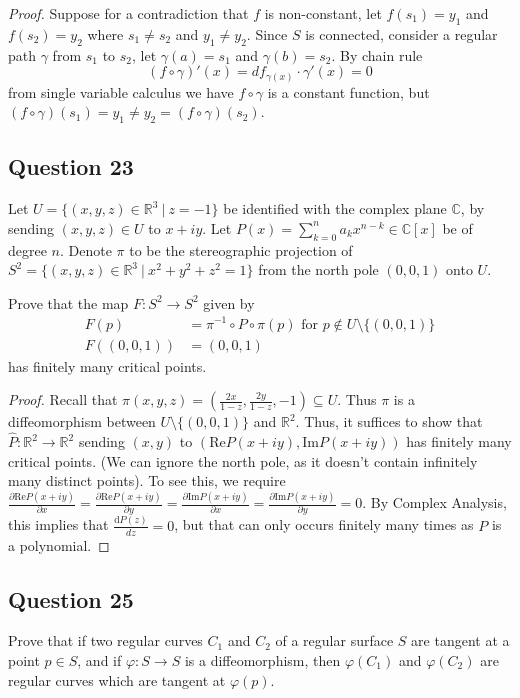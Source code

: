 \documentclass[12pt]{article}
\begin{document}
\emph{Proof.}
Suppose for a contradiction that \(f\) is non-constant, let \(f(s_1) = y_1\) and \(f(s_2) = y_2\) where \(s_1 \ne s_2\) and \(y_1 \ne y_2\).
Since \(S\) is connected, consider a regular path \(\gamma\) from \(s_1\) to \(s_2\), let \(\gamma(a) = s_1\) and \(\gamma(b) = s_2\).
By chain rule
\[ (f\circ \gamma)'(x) = df_{\gamma(x)}\cdot \gamma'(x) = 0 \]
from single variable calculus we have \(f\circ\gamma\) is a constant function,
but \((f\circ\gamma)(s_1) = y_1 \ne y_2 = (f\circ\gamma)(s_2)\).

\subsection*{Question 23}

Let $U = \{(x, y, z) \in \mathbb{R}^3\ |\ z = -1\}$ be identified
with the complex plane $\mathbb C$, by sending $(x, y, z) \in U$ to $x + iy.$
Let $P(x) = \sum_{k = 0}^n a_k x^{n-k} \in \mathbb C[x]$ be of degree $n$.
Denote $\pi$ to be the stereographic projection
of $S^2 = \{(x, y, z) \in \mathbb{R}^3\ |\ x^2 + y^2 + z^2 = 1\}$
from the north pole $(0,0,1)$ onto $U$.

Prove that the map $F: S^2 \to S^2$ given by
\begin{align*}
    F(p) &= \pi^{-1}\circ P \circ \pi(p)\text{ for }p \not\in U\setminus\{(0,0,1)\}
    \\F((0,0,1)) &= (0,0,1)
\end{align*}
has finitely many critical points.

\begin{proof}
    Recall that $\pi(x, y, z) = \left(\frac{2x}{1-z}, \frac{2y}{1-z}, -1\right) \subseteq U$.
    Thus $\pi$ is a diffeomorphism between $U\setminus\{(0,0,1)\}$ and $\mathbb R^2$. Thus, it suffices to
    show that $\hat{P} : \mathbb R^2 \to \mathbb R^2$ sending $(x, y)$ to $(\mathrm{Re} P(x+iy), \mathrm{Im} P(x+iy))$
    has finitely many critical points. (We can ignore the north pole, as it doesn't contain infinitely many distinct points).
    To see this, we require $\frac{\partial \mathrm{Re} P(x+iy)}{\partial x}=\frac{\partial \mathrm{Re} P(x+iy)}{\partial y}=\frac{\partial \mathrm{Im} P(x+iy)}{\partial x}=\frac{\partial \mathrm{Im} P(x+iy)}{\partial y} = 0.$
    By Complex Analysis, this implies that $\frac{\mathrm dP(z)}{dz} = 0$, but that can only occurs finitely many times as $P$ is a polynomial.
\end{proof}

\subsection*{Question 25}
Prove that if two regular curves $C_1$ and $C_2$ of a regular surface $S$ are tangent at a point $p \in S$, and if $\varphi: S \to S$ is a diffeomorphism, then $\varphi(C_1)$ and $\varphi(C_2)$ are regular curves which are tangent at $\varphi(p)$.\\
\end{document}
